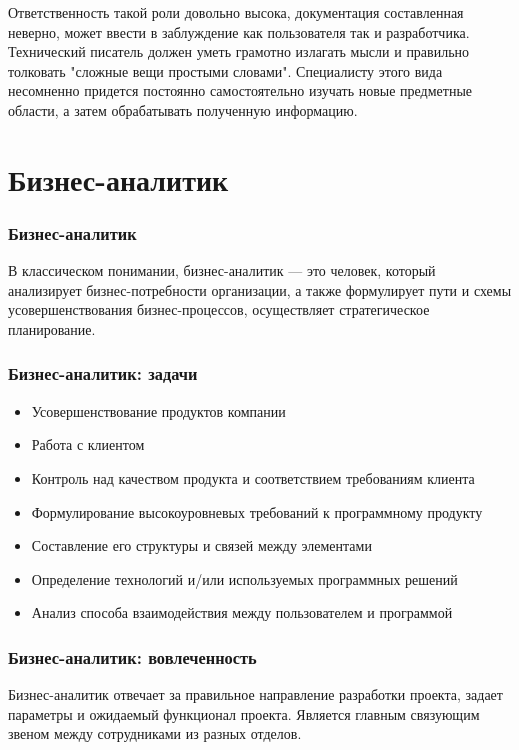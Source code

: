 \documentclass{../industrial-development}
\begin{document}
		Ответственность такой роли довольно высока, документация составленная неверно, может ввести в заблуждение как пользователя так и разработчика. Технический писатель должен уметь грамотно излагать мысли и правильно толковать "сложные вещи простыми словами". Специалисту этого вида несомненно придется постоянно самостоятельно изучать новые предметные области, а затем обрабатывать полученную информацию.
		
	\section{Бизнес-аналитик}
	
	\begin{frame} \frametitle{Бизнес-аналитик}
		\begin{block}{}
			\alert {}В классическом понимании, {бизнес-аналитик} — это человек, который анализирует бизнес-потребности организации, а также формулирует пути и схемы усовершенствования бизнес-процессов, осуществляет стратегическое планирование. 
		\end{block}
		
	\end{frame}
	
	\begin{frame} \frametitle{Бизнес-аналитик: задачи}
		\begin{itemize}
			\item Усовершенствование продуктов компании
			\item Работа с клиентом
			\item Контроль над качеством продукта и соответствием требованиям клиента
			\item Формулирование высокоуровневых требований к программному продукту
			\item Составление его структуры и связей между элементами
			\item Определение технологий и/или используемых программных решений
			\item Анализ способа взаимодействия между пользователем и программой
		\end{itemize}
	\end{frame}
	
	\begin{frame} \frametitle{Бизнес-аналитик: вовлеченность}
		Бизнес-аналитик отвечает за правильное направление разработки проекта, задает параметры и ожидаемый функционал проекта. Является главным связующим звеном между сотрудниками из разных отделов.
	\end{frame}
	
\end{document}
